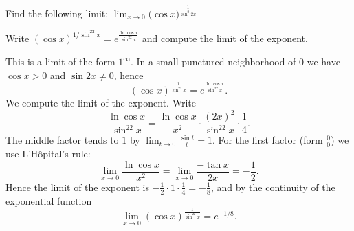 
\begin{question}
Find the following limit:
$\displaystyle\lim_{x\to0}\big(\cos x\big)^{\frac{1}{\sin^2 2x}}$
\end{question}

\begin{hint}
Write $(\cos x)^{1/\sin^22x}=e^{\frac{\ln\cos x}{\sin^22x}}$ and compute the limit of the exponent.
\end{hint}

\begin{solution}
This is a limit of the form $1^\infty$. In a small punctured neighborhood of $0$ we have $\cos x>0$ and $\sin2x\neq0$, hence
\[ (\cos x)^{\frac1{\sin^22x}}=e^{\frac{\ln\cos x}{\sin^22x}}. \]
We compute the limit of the exponent. Write
\[ \frac{\ln\cos x}{\sin^22x}=\frac{\ln\cos x}{x^2}\cdot\frac{(2x)^2}{\sin^22x}\cdot\frac14. \]
The middle factor tends to $1$ by $\lim_{t\to0}\frac{\sin t}{t}=1$. For the first factor (form $\frac00$) we use L'Hôpital's rule:
\[ \lim_{x\to0}\frac{\ln\cos x}{x^2}=\lim_{x\to0}\frac{-\tan x}{2x}=-\frac12. \]
Hence the limit of the exponent is $-\frac12\cdot1\cdot\frac14=-\frac18$, and by the continuity of the exponential function
\[ \lim_{x\to0}(\cos x)^{\frac1{\sin^22x}}=e^{-1/8}. \]
\end{solution}
